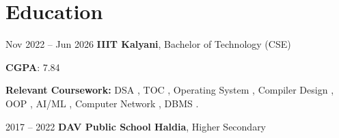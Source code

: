 \section{Education}



        
        \begin{twocolentry}{
            Nov 2022 – Jun 2026
        }
            \textbf{IIIT Kalyani}, Bachelor of Technology (CSE) \end{twocolentry}

        \begin{onecolentry}
            \begin{highlights}
                \item \textbf{CGPA}: 7.84
                \item \textbf{Relevant Coursework:} DSA , TOC , Operating System , Compiler Design , OOP , AI/ML , Computer Network , DBMS .
            \end{highlights}
        \end{onecolentry}
        \begin{twocolentry}{
            2017 – 2022
        }
            \textbf{DAV Public School Haldia}, Higher Secondary \end{twocolentry}

           